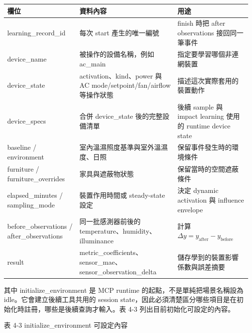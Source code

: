 \documentclass[12pt,a4paper]{article}
\begin{document}
\begin{table}[htbp]
\centering
\footnotesize
\renewcommand{\arraystretch}{1.25}
\begin{tabular}{|>{\raggedright\arraybackslash}p{}|>{\raggedright\arraybackslash}p{}|>{\raggedright\arraybackslash}p{}|}
\hline
\textbf{欄位} & \textbf{資料內容} & \textbf{用途} \\
\hline
learning\_\allowbreak{}record\_\allowbreak{}id & 每次 start 產生的唯一編號 & finish 時把 after observations 接回同一筆事件 \\
\hline
device\_\allowbreak{}name & 被操作的設備名稱，例如 ac\_\allowbreak{}main & 指定要學習哪個非連網裝置 \\
\hline
device\_\allowbreak{}state & activation、kind、power 與 AC mode/setpoint/fan/airflow 等操作狀態 & 描述這次實際套用的裝置動作 \\
\hline
device\_\allowbreak{}specs & 合併 device\_\allowbreak{}state 後的完整設備清單 & 後續 sample 與 impact learning 使用的 runtime device state \\
\hline
baseline / environment & 室內溫濕照度基準與室外溫濕度、日照 & 保留事件發生時的環境條件 \\
\hline
furniture / furniture\_\allowbreak{}overrides & 家具與遮蔽物狀態 & 保留當時的空間遮蔽條件 \\
\hline
elapsed\_\allowbreak{}minutes / sampling\_\allowbreak{}mode & 裝置作用時間或 steady-state 設定 & 決定 dynamic activation 與 influence envelope \\
\hline
before\_\allowbreak{}observations / after\_\allowbreak{}observations & 同一批感測器前後的 temperature、humidity、illuminance & 計算 $\Delta y = y_{\mathrm{after}}-y_{\mathrm{before}}$ \\
\hline
result & metric\_\allowbreak{}coefficients、sensor\_\allowbreak{}mae、sensor\_\allowbreak{}observation\_\allowbreak{}delta & 儲存學到的裝置影響係數與誤差摘要 \\
\hline
\end{tabular}
\end{table}

其中 initialize\_\allowbreak{}environment 是 MCP runtime 的起點，不是單純把場景名稱設為 idle。它會建立後續工具共用的 session state，因此必須清楚區分哪些項目是在初始化時註冊，哪些是後續查詢才輸入。表 4-3 列出目前初始化可設定的內容。


表 4-3 initialize\_\allowbreak{}environment 可設定內容
\end{document}

